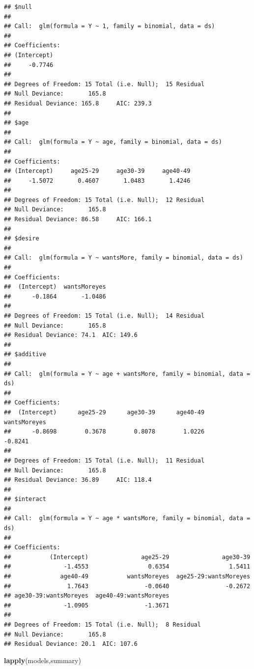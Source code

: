 \documentclass[
]{article}
\newenvironment{Shaded}{\begin{snugshade}}{\end{snugshade}}
\newcommand{\FunctionTok}[1]{\textcolor[rgb]{0.13,0.29,0.53}{\textbf{#1}}}
\newcommand{\NormalTok}[1]{#1}
\begin{document}
\begin{verbatim}
## $null
## 
## Call:  glm(formula = Y ~ 1, family = binomial, data = ds)
## 
## Coefficients:
## (Intercept)  
##     -0.7746  
## 
## Degrees of Freedom: 15 Total (i.e. Null);  15 Residual
## Null Deviance:       165.8 
## Residual Deviance: 165.8     AIC: 239.3
## 
## $age
## 
## Call:  glm(formula = Y ~ age, family = binomial, data = ds)
## 
## Coefficients:
## (Intercept)     age25-29     age30-39     age40-49  
##     -1.5072       0.4607       1.0483       1.4246  
## 
## Degrees of Freedom: 15 Total (i.e. Null);  12 Residual
## Null Deviance:       165.8 
## Residual Deviance: 86.58     AIC: 166.1
## 
## $desire
## 
## Call:  glm(formula = Y ~ wantsMore, family = binomial, data = ds)
## 
## Coefficients:
##  (Intercept)  wantsMoreyes  
##      -0.1864       -1.0486  
## 
## Degrees of Freedom: 15 Total (i.e. Null);  14 Residual
## Null Deviance:       165.8 
## Residual Deviance: 74.1  AIC: 149.6
## 
## $additive
## 
## Call:  glm(formula = Y ~ age + wantsMore, family = binomial, data = ds)
## 
## Coefficients:
##  (Intercept)      age25-29      age30-39      age40-49  wantsMoreyes  
##      -0.8698        0.3678        0.8078        1.0226       -0.8241  
## 
## Degrees of Freedom: 15 Total (i.e. Null);  11 Residual
## Null Deviance:       165.8 
## Residual Deviance: 36.89     AIC: 118.4
## 
## $interact
## 
## Call:  glm(formula = Y ~ age * wantsMore, family = binomial, data = ds)
## 
## Coefficients:
##           (Intercept)               age25-29               age30-39  
##               -1.4553                 0.6354                 1.5411  
##              age40-49           wantsMoreyes  age25-29:wantsMoreyes  
##                1.7643                -0.0640                -0.2672  
## age30-39:wantsMoreyes  age40-49:wantsMoreyes  
##               -1.0905                -1.3671  
## 
## Degrees of Freedom: 15 Total (i.e. Null);  8 Residual
## Null Deviance:       165.8 
## Residual Deviance: 20.1  AIC: 107.6
\end{verbatim}

\begin{Shaded}
\begin{Highlighting}[]
\FunctionTok{lapply}\NormalTok{(models,summary)}
\end{Highlighting}
\end{Shaded}
\end{document}
